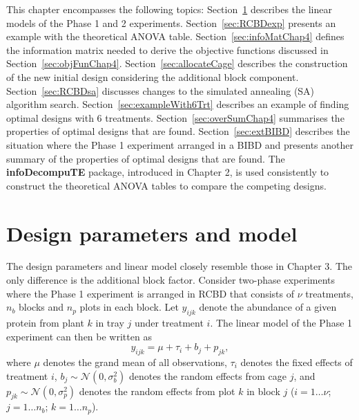 This chapter encompasses the following topics: Section~\ref{sec:desParModelChap4} describes the linear models of the Phase 1 and 2 experiments. Section~\ref{sec:RCBDexp} presents an example with the theoretical ANOVA table. Section~\ref{sec:infoMatChap4} defines the information matrix needed to derive the objective functions discussed in Section~\ref{sec:objFunChap4}. Section~\ref{sec:allocateCage} describes the construction of the new initial design considering the additional block component. Section~\ref{sec:RCBDsa} discusses changes to the simulated annealing (SA) algorithm search. Section~\ref{sec:exampleWith6Trt} describes an example of finding optimal designs with 6 treatments. Section~\ref{sec:overSumChap4} summarises the properties of optimal designs that are found. Section~\ref{sec:extBIBD} describes the situation where the Phase 1 experiment arranged in a BIBD and presents another summary of the properties of optimal designs that are found.  The \textbf{infoDecompuTE} package, introduced in Chapter 2, is used consistently to construct the theoretical ANOVA tables to compare the competing designs. 






\section{Design parameters and model}
\label{sec:desParModelChap4}
The design parameters and linear model closely resemble those in Chapter 3. The only difference is the additional block factor. Consider two-phase experiments where the Phase 1 experiment is arranged in RCBD that consists of $\nu$ treatments, $n_b$ blocks and $n_{p}$ plots in each block. Let $y_{ijk}$ denote the abundance of a given protein from plant $k$ in tray $j$ under treatment $i$. The linear model of the Phase 1 experiment can then be written as 
\begin{equation}\label{eq:phase1modelChap4}
y_{ijk} = \mu + \tau_i+ b_{j} + p_{jk},
\end{equation}
where $\mu$ denotes the grand mean of all observations, $\tau_i$ denotes the fixed effects of treatment $i$, $b_{j} \sim \mathcal{N}(0, \sigma_{b}^2)$ denotes the random effects from cage $j$, and $p_{jk} \sim \mathcal{N}(0, \sigma_{p}^2)$ denotes the random effects from plot $k$ in block $j$ ($i = 1 \dots \nu$;$j = 1 \dots n_b$; $k = 1 \dots n_p$). 

